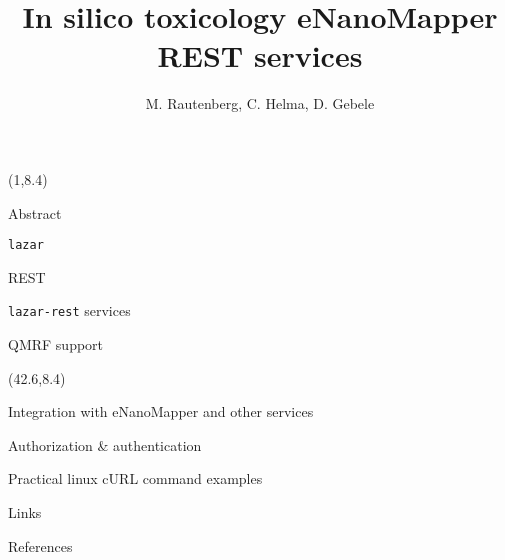 \documentclass[final]{beamer}
\title{In silico toxicology eNanoMapper REST services}
\author{M. Rautenberg, C. Helma, D. Gebele}
\institute{\emph{in silico} toxicology gmbh, Basel, Switzerland}
\begin{document}
  \begin{frame}{}

    \begin{textblock}{40.5}(1,8.4)
      \begin{block}{Abstract}
        \justifying
        
      \end{block}

      \begin{block}{{\tt lazar}}
        \justifying
        
      \end{block}

      \begin{block}{REST}
        \justifying
        
      \end{block}

      \begin{block}{{\tt lazar-rest} services}
        \justifying
        
      \end{block}


      \begin{block}{QMRF support}
        \justifying
        
      \end{block}

    \end{textblock}

    \begin{textblock}{40.5}(42.6,8.4)

      \begin{block}{Integration with eNanoMapper and other services}
        
      \end{block}

      \begin{block}{Authorization \& authentication}
        \justifying        
        
      \end{block}

      \begin{alertblock}{Practical linux cURL command examples}
        
      \end{alertblock}

      \begin{exampleblock}{Links}
        
      \end{exampleblock}

      \begin{block}{References}
        \justifying
        \small
      \end{block}

    \end{textblock}

  \end{frame}
\end{document}
